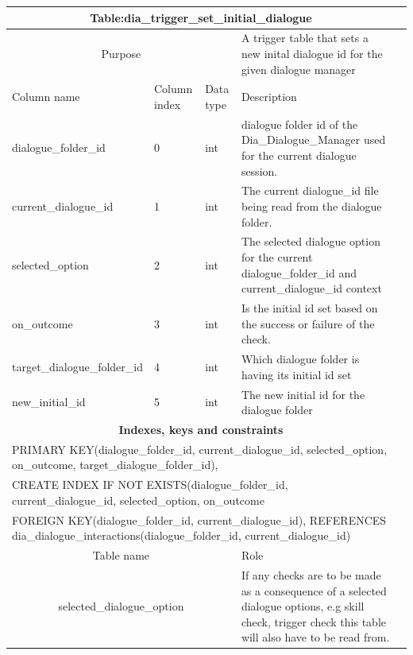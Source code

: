 \documentclass{report}
\begin{document}
\begin{table}[h]
\begin{tabular}{ |p{6cm}|p{1.2cm}|p{3cm}|p{3.6cm}|p{3.6cm}|  }
\hline
 \multicolumn{4}{|c|}{\textbf{Table:dia\_trigger\_set\_initial\_dialogue}} \\
 \hline
 \multicolumn{3}{|c|}{Purpose} & {A trigger table that sets a new  inital dialogue id for the given dialogue manager} \\
 \hline
 Column name & Column index & Data type & Description \\
  \hline
 dialogue\_folder\_id & 0 & int & dialogue folder id of the Dia\_Dialogue\_Manager used for the current dialogue session.\\
 current\_dialogue\_id & 1 & int & The current dialogue\_id file being read from the dialogue folder.\\
 selected\_option & 2 & int & The selected dialogue option for the current dialogue\_folder\_id and current\_dialogue\_id context \\
 on\_outcome & 3 & int & Is the initial id set based on the success or failure of the check. \\
 target\_dialogue\_folder\_id & 4 & int & Which dialogue folder is having its initial id set \\
 new\_initial\_id & 5 & int & The new initial id for the dialogue folder \\
 \hline
\multicolumn{4}{|c|}{\textbf{Indexes, keys and constraints}}  \\
\hline
   \multicolumn{4}{|p{5cm}|}{PRIMARY KEY(dialogue{\_}folder{\_}id, current{\_}dialogue{\_}id, selected\_option, on\_outcome, target\_dialogue\_folder\_id),} \\
      \multicolumn{4}{|p{5cm}|}{CREATE INDEX IF NOT EXISTS(dialogue{\_}folder{\_}id, current{\_}dialogue{\_}id, selected{\_option}, on{\_outcome}} \\ 
   \hline
   \multicolumn{4}{|p{5cm}|}{FOREIGN KEY(dialogue{\_}folder{\_}id, current{\_}dialogue{\_}id), REFERENCES dia\_dialogue\_interactions(dialogue{\_}folder{\_}id, current{\_}dialogue{\_}id)} \\      
\multicolumn{3}{|c|}{Table name} & Role \\
\hline
\multicolumn{3}{|c|}{selected\_dialogue\_option} & If any checks are to be made as a consequence of a selected dialogue options, e.g skill check, trigger check this table will also have to be read from. \\
\hline
\end{tabular}
\end{table}
\end{document}
